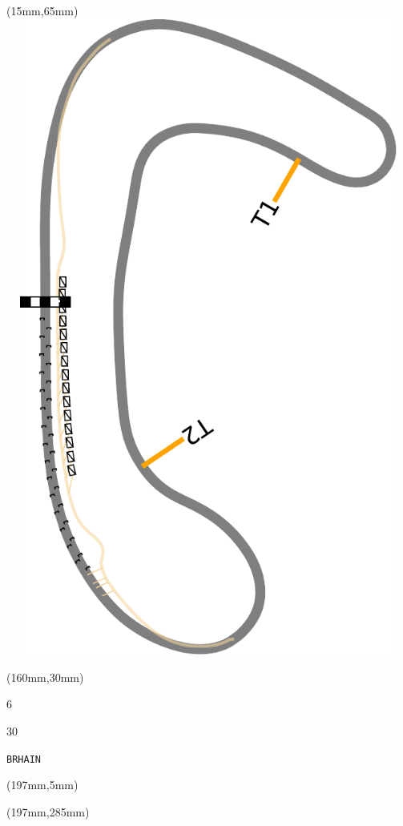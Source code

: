 \begin{textblock*}{185mm}(15mm,65mm)%
\centering
\mbox{\includegraphics[width=185mm,height=210mm,keepaspectratio]{PT/BRHAIN.pdf}}
\end{textblock*}
\begin{textblock*}{40mm}(160mm,30mm)%
\Large
\par{} 
\par6 
\par30 
\par\hfill\tiny\tt BRHAIN\\
\end{textblock*}
\begin{textblock*}{20mm}(197mm,5mm)%
\fbox{\thepage}
\label{BRHAIN}
\end{textblock*}
\begin{textblock*}{20mm}(197mm,285mm)%
\fbox{\thepage}
\end{textblock*}

